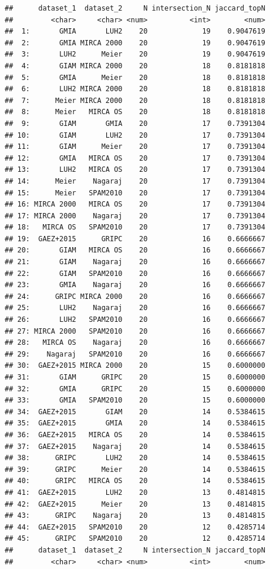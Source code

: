 \documentclass[
  11pt,
]{article}
\begin{document}
\begin{verbatim}
##      dataset_1  dataset_2     N intersection_N jaccard_topN
##         <char>     <char> <num>          <int>        <num>
##  1:       GMIA       LUH2    20             19    0.9047619
##  2:       GMIA MIRCA 2000    20             19    0.9047619
##  3:       LUH2      Meier    20             19    0.9047619
##  4:       GIAM MIRCA 2000    20             18    0.8181818
##  5:       GMIA      Meier    20             18    0.8181818
##  6:       LUH2 MIRCA 2000    20             18    0.8181818
##  7:      Meier MIRCA 2000    20             18    0.8181818
##  8:      Meier   MIRCA OS    20             18    0.8181818
##  9:       GIAM       GMIA    20             17    0.7391304
## 10:       GIAM       LUH2    20             17    0.7391304
## 11:       GIAM      Meier    20             17    0.7391304
## 12:       GMIA   MIRCA OS    20             17    0.7391304
## 13:       LUH2   MIRCA OS    20             17    0.7391304
## 14:      Meier    Nagaraj    20             17    0.7391304
## 15:      Meier   SPAM2010    20             17    0.7391304
## 16: MIRCA 2000   MIRCA OS    20             17    0.7391304
## 17: MIRCA 2000    Nagaraj    20             17    0.7391304
## 18:   MIRCA OS   SPAM2010    20             17    0.7391304
## 19:  GAEZ+2015      GRIPC    20             16    0.6666667
## 20:       GIAM   MIRCA OS    20             16    0.6666667
## 21:       GIAM    Nagaraj    20             16    0.6666667
## 22:       GIAM   SPAM2010    20             16    0.6666667
## 23:       GMIA    Nagaraj    20             16    0.6666667
## 24:      GRIPC MIRCA 2000    20             16    0.6666667
## 25:       LUH2    Nagaraj    20             16    0.6666667
## 26:       LUH2   SPAM2010    20             16    0.6666667
## 27: MIRCA 2000   SPAM2010    20             16    0.6666667
## 28:   MIRCA OS    Nagaraj    20             16    0.6666667
## 29:    Nagaraj   SPAM2010    20             16    0.6666667
## 30:  GAEZ+2015 MIRCA 2000    20             15    0.6000000
## 31:       GIAM      GRIPC    20             15    0.6000000
## 32:       GMIA      GRIPC    20             15    0.6000000
## 33:       GMIA   SPAM2010    20             15    0.6000000
## 34:  GAEZ+2015       GIAM    20             14    0.5384615
## 35:  GAEZ+2015       GMIA    20             14    0.5384615
## 36:  GAEZ+2015   MIRCA OS    20             14    0.5384615
## 37:  GAEZ+2015    Nagaraj    20             14    0.5384615
## 38:      GRIPC       LUH2    20             14    0.5384615
## 39:      GRIPC      Meier    20             14    0.5384615
## 40:      GRIPC   MIRCA OS    20             14    0.5384615
## 41:  GAEZ+2015       LUH2    20             13    0.4814815
## 42:  GAEZ+2015      Meier    20             13    0.4814815
## 43:      GRIPC    Nagaraj    20             13    0.4814815
## 44:  GAEZ+2015   SPAM2010    20             12    0.4285714
## 45:      GRIPC   SPAM2010    20             12    0.4285714
##      dataset_1  dataset_2     N intersection_N jaccard_topN
##         <char>     <char> <num>          <int>        <num>
\end{verbatim}
\end{document}
